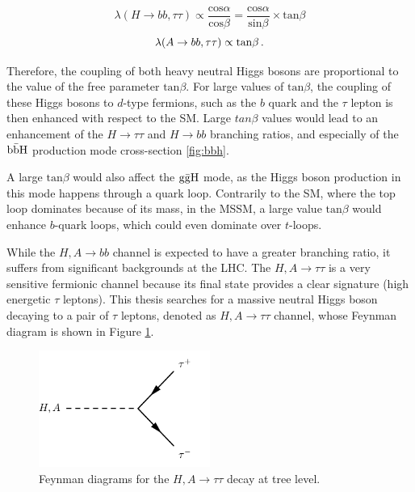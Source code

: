 \begin{equation}
    \lambda(H \rightarrow bb, \tau\tau) \propto \frac{\mathrm{cos} \alpha}{\mathrm{cos} \beta} = \frac{\mathrm{cos} \alpha}{\mathrm{sin} \beta} \times \mathrm{tan} \beta
\end{equation}
\begin{equation}
    \lambda(A \rightarrow bb, \tau\tau) \propto \mathrm{tan} \beta \mend
\end{equation}

Therefore, the coupling of both heavy neutral Higgs bosons are proportional to the value of the free parameter $\mathrm{tan} \beta$. For large values of $\mathrm{tan} \beta$, the coupling of these Higgs bosons to $d$-type fermions, such as the $b$ quark and the $\tau$ lepton is then enhanced with respect to the SM. Large $tan \beta$ values would lead to an enhancement of the $H \rightarrow \tau\tau$ and $H \rightarrow bb$ branching ratios, and especially of the $\mathrm{b\Bar{b}H}$ production mode cross-section \ref{fig:bbh}.

A large $\mathrm{tan} \beta$ would also affect the $\mathrm{g\Bar{g}H}$ mode, as the Higgs boson production in this mode happens through a quark loop. Contrarily to the SM, where the top loop dominates because of its mass, in the MSSM, a large value $\mathrm{tan} \beta$ would enhance $b$-quark loops, which could even dominate over $t$-loops.\newline


While the $H,A \rightarrow bb$ channel is expected to have a greater branching ratio, it suffers from significant backgrounds at the LHC. The $H,A \rightarrow \tau\tau$ is a very sensitive fermionic channel because its final state provides a clear signature (high energetic $\tau$ leptons). This thesis searches for a massive neutral Higgs boson decaying to a pair of $\tau$ leptons, denoted as $H, A \rightarrow \tau\tau$ channel, whose Feynman diagram is shown in Figure \ref{fig:htt}.

\begin{figure}
    \centering
    \includegraphics[width=0.5\textwidth]{Images/htt.pdf}
    \caption{Feynman diagrams for the $H,A \rightarrow \tau\tau$ decay at tree level.}
    \label{fig:htt}
\end{figure}

